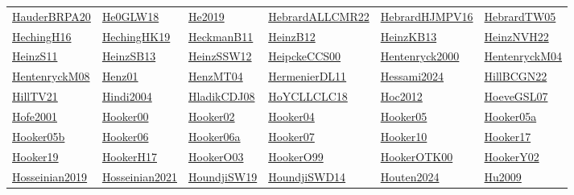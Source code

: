 \begin{longtable}{*{6}{l}}
\hyperref[detail:HauderBRPA20]{HauderBRPA20} & \hyperref[detail:He0GLW18]{He0GLW18} & \hyperref[detail:He2019]{He2019} & \hyperref[detail:HebrardALLCMR22]{HebrardALLCMR22} & \hyperref[detail:HebrardHJMPV16]{HebrardHJMPV16} & \hyperref[detail:HebrardTW05]{HebrardTW05}\\ 
\hyperref[detail:HechingH16]{HechingH16} & \hyperref[detail:HechingHK19]{HechingHK19} & \hyperref[detail:HeckmanB11]{HeckmanB11} & \hyperref[detail:HeinzB12]{HeinzB12} & \hyperref[detail:HeinzKB13]{HeinzKB13} & \hyperref[detail:HeinzNVH22]{HeinzNVH22}\\ 
\hyperref[detail:HeinzS11]{HeinzS11} & \hyperref[detail:HeinzSB13]{HeinzSB13} & \hyperref[detail:HeinzSSW12]{HeinzSSW12} & \hyperref[detail:HeipckeCCS00]{HeipckeCCS00} & \hyperref[detail:Hentenryck2000]{Hentenryck2000} & \hyperref[detail:HentenryckM04]{HentenryckM04}\\ 
\hyperref[detail:HentenryckM08]{HentenryckM08} & \hyperref[detail:Henz01]{Henz01} & \hyperref[detail:HenzMT04]{HenzMT04} & \hyperref[detail:HermenierDL11]{HermenierDL11} & \hyperref[detail:Hessami2024]{Hessami2024} & \hyperref[detail:HillBCGN22]{HillBCGN22}\\ 
\hyperref[detail:HillTV21]{HillTV21} & \hyperref[detail:Hindi2004]{Hindi2004} & \hyperref[detail:HladikCDJ08]{HladikCDJ08} & \hyperref[detail:HoYCLLCLC18]{HoYCLLCLC18} & \hyperref[detail:Hoc2012]{Hoc2012} & \hyperref[detail:HoeveGSL07]{HoeveGSL07}\\ 
\hyperref[detail:Hofe2001]{Hofe2001} & \hyperref[detail:Hooker00]{Hooker00} & \hyperref[detail:Hooker02]{Hooker02} & \hyperref[detail:Hooker04]{Hooker04} & \hyperref[detail:Hooker05]{Hooker05} & \hyperref[detail:Hooker05a]{Hooker05a}\\ 
\hyperref[detail:Hooker05b]{Hooker05b} & \hyperref[detail:Hooker06]{Hooker06} & \hyperref[detail:Hooker06a]{Hooker06a} & \hyperref[detail:Hooker07]{Hooker07} & \hyperref[detail:Hooker10]{Hooker10} & \hyperref[detail:Hooker17]{Hooker17}\\ 
\hyperref[detail:Hooker19]{Hooker19} & \hyperref[detail:HookerH17]{HookerH17} & \hyperref[detail:HookerO03]{HookerO03} & \hyperref[detail:HookerO99]{HookerO99} & \hyperref[detail:HookerOTK00]{HookerOTK00} & \hyperref[detail:HookerY02]{HookerY02}\\ 
\hyperref[detail:Hosseinian2019]{Hosseinian2019} & \hyperref[detail:Hosseinian2021]{Hosseinian2021} & \hyperref[detail:HoundjiSW19]{HoundjiSW19} & \hyperref[detail:HoundjiSWD14]{HoundjiSWD14} & \hyperref[detail:Houten2024]{Houten2024} & \hyperref[detail:Hu2009]{Hu2009}\\ 

\end{longtable}
